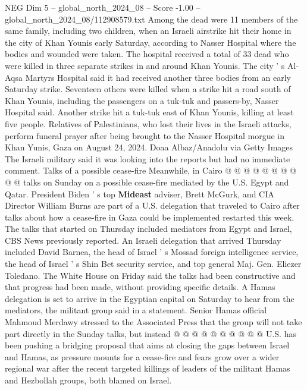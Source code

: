 \begin{textsample}{NEG Dim 5 – global\_north\_2024\_08 – Score -1.00 – global\_north\_2024\_08/112908579.txt}  \label{ex:f5_neg_062}
Among the dead were 11 members of the same family, including two children, when an Israeli airstrike hit their home in the city of Khan Younis early Saturday, according to Nasser Hospital where the bodies and wounded were taken.
The hospital received a total of 33 dead who were killed in three separate strikes in and around Khan Younis.
The city ' s Al-Aqsa Martyrs Hospital said it had received another three bodies from an early Saturday strike.
Seventeen others were killed when a strike hit a road south of Khan Younis, including the passengers on a tuk-tuk and passers-by, Nasser Hospital said.
Another strike hit a tuk-tuk east of Khan Younis, killing at least five people.
Relatives of Palestinians, who lost their lives in the Israeli attacks, perform funeral prayer after being brought to the Nasser Hospital morgue in Khan Yunis, Gaza on August 24, 2024.
Doaa Albaz/Anadolu via Getty Images The Israeli military said it was looking into the reports but had no immediate comment.
Talks of a possible cease-fire Meanwhile, in Cairo @ @ @ @ @ @ @ @ @ @ talks on Sunday on a possible cease-fire mediated by the U.S.
Egypt and Qatar.
President Biden ' s top \textbf{Mideast} adviser, Brett McGurk, and CIA Director William Burns are part of a U.S. delegation that traveled to Cairo after talks about how a cease-fire in Gaza could be implemented restarted this week.
The talks that started on Thursday included mediators from Egypt and Israel, CBS News previously reported.
An Israeli delegation that arrived Thursday included David Barnea, the head of Israel ' s Mossad foreign intelligence service, the head of Israel ' s Shin Bet security service, and top general Maj.
Gen.
Eliezer Toledano.
The White House on Friday said the talks had been constructive and that progress had been made, without providing specific details.
A Hamas delegation is set to arrive in the Egyptian capital on Saturday to hear from the mediators, the militant group said in a statement.
Senior Hamas official Mahmoud Merdawy stressed to the Associated Press that the group will not take part directly in the Sunday talks, but instead @ @ @ @ @ @ @ @ @ @ U.S. has been pushing a bridging proposal that aims at closing the gaps between Israel and Hamas, as pressure mounts for a cease-fire and fears grow over a wider regional war after the recent targeted killings of leaders of the militant Hamas and Hezbollah groups, both blamed on Israel.

\end{textsample}
